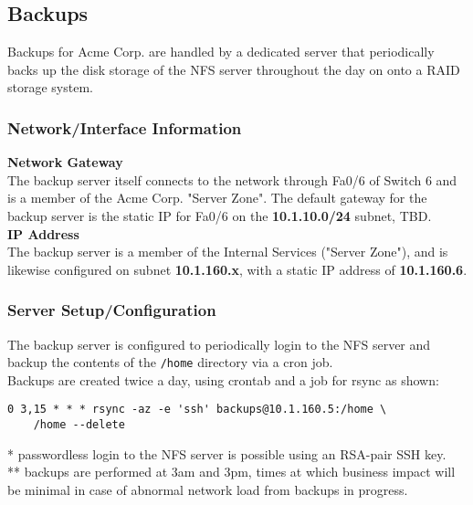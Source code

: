 \subsection{Backups} \label{backups}
Backups for Acme Corp. are handled by a dedicated server that periodically 
backs up the disk storage of the NFS server throughout the day on onto a RAID 
storage system.

\subsubsection{Network/Interface Information}
\textbf{Network Gateway} \\
The backup server itself connects to the network through Fa0/6 of Switch 6 and 
is a member of the Acme Corp. "Server Zone". The default gateway for the backup 
server is the static IP for Fa0/6 on the \textbf{10.1.10.0/24} subnet, TBD. \\

\noindent
\textbf{IP Address} \\
The backup server is a member of the Internal Services ("Server Zone"), and is
likewise configured on subnet \textbf{10.1.160.x}, with a static IP address of 
\textbf{10.1.160.6}. \\

\subsubsection{Server Setup/Configuration}
The backup server is configured to periodically login to the NFS server and
backup the contents of the \lstinline$/home$ directory via a cron job. \\

\noindent
Backups are created twice a day, using crontab and a job for rsync as shown: \\

\begin{lstlisting}[backgroundcolor=\color{Gray}]
 0 3,15 * * * rsync -az -e 'ssh' backups@10.1.160.5:/home \
    /home --delete
\end{lstlisting}
\vspace{1em}
* passwordless login to the NFS server is possible using an RSA-pair SSH key. \\
\noindent
** backups are performed at 3am and 3pm, times at which business impact will 
be minimal in case of abnormal network load from backups in progress.
